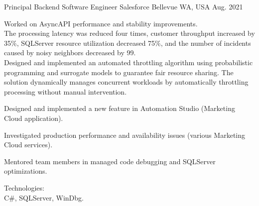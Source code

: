 
\begin{cventries}

\cventry
{Principal Backend Software Engineer} %
{Salesforce} %
{Bellevue WA, USA} %
{Aug. 2021 } %
{
  \begin{cvitems} %
    \item
    {
      Worked on AsyncAPI performance and stability improvements.\\
      The processing latency was reduced four times, customer throughput increased by 35\%, SQLServer resource utilization decreased 75\%, and the number of incidents caused by noisy neighbors decreased by 99.\\
      Designed and implemented an automated throttling algorithm using probabilistic programming and surrogate models to guarantee fair resource sharing. The solution dynamically manages concurrent workloads by automatically throttling processing without manual intervention.
      }
    \item
    {
      Designed and implemented a new feature in Automation Studio (Marketing Cloud application).
    }
    \item
    {
      Investigated production performance and availability issues (various Marketing Cloud services).
    }
    \item
    {
      Mentored team members in managed code debugging and SQLServer optimizations.
    }
    \item
    {
      Technologies:\\
      {C\#}, SQLServer, WinDbg.\\
    }
  \end{cvitems}
}



\end{cventries}
